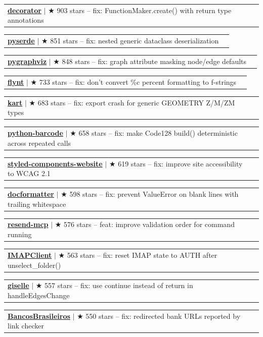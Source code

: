 \documentclass[letterpaper,11pt]{article}
\makeatletter
\newcommand{\resumeProjectHeading}[2]{
    \item
    \begin{tabular*}{0.97\textwidth}{l@{\extracolsep{\fill}}r}
      \small#1 & \hspace{8pt}\small#2 \\
    \end{tabular*}\vspace{-11.4pt}
}
\makeatother
\begin{document}
      \resumeProjectHeading{\textbf{\href{https://github.com/micheles/decorator/pull/186}{decorator}} $|$ {\small $\bigstar$ 903 stars} \textnormal{ -- fix: FunctionMaker.create() with return type annotations}}{}
      \resumeProjectHeading{\textbf{\href{https://github.com/yukinarit/pyserde/pull/775}{pyserde}} $|$ {\small $\bigstar$ 851 stars} \textnormal{ -- fix: nested generic dataclass deserialization}}{}
      \resumeProjectHeading{\textbf{\href{https://github.com/pygraphviz/pygraphviz/pull/639}{pygraphviz}} $|$ {\small $\bigstar$ 848 stars} \textnormal{ -- fix: graph attribute masking node/edge defaults}}{}
      \resumeProjectHeading{\textbf{\href{https://github.com/ikamensh/flynt/pull/254}{flynt}} $|$ {\small $\bigstar$ 733 stars} \textnormal{ -- fix: don't convert \%c percent formatting to f-strings}}{}
      \resumeProjectHeading{\textbf{\href{https://github.com/koordinates/kart/pull/1120}{kart}} $|$ {\small $\bigstar$ 683 stars} \textnormal{ -- fix: export crash for generic GEOMETRY Z/M/ZM types}}{}
      \resumeProjectHeading{\textbf{\href{https://github.com/WhyNotHugo/python-barcode/commit/73316bf7e485b8aefcf89f3aaab8f76b8f261375}{python-barcode}} $|$ {\small $\bigstar$ 658 stars} \textnormal{ -- fix: make Code128 build() deterministic across repeated calls}}{}
      \resumeProjectHeading{\textbf{\href{https://github.com/styled-components/styled-components-website/pull/993}{styled-components-website}} $|$ {\small $\bigstar$ 619 stars} \textnormal{ -- fix: improve site accessibility to WCAG 2.1}}{}
      \resumeProjectHeading{\textbf{\href{https://github.com/PyCQA/docformatter/pull/360}{docformatter}} $|$ {\small $\bigstar$ 598 stars} \textnormal{ -- fix: prevent ValueError on blank lines with trailing whitespace}}{}
      \resumeProjectHeading{\textbf{\href{https://github.com/resend/resend-mcp/pull/166}{resend-mcp}} $|$ {\small $\bigstar$ 576 stars} \textnormal{ -- feat: improve validation order for command running}}{}
      \resumeProjectHeading{\textbf{\href{https://github.com/mjs/imapclient/pull/644}{IMAPClient}} $|$ {\small $\bigstar$ 563 stars} \textnormal{ -- fix: reset IMAP state to AUTH after unselect\_folder()}}{}
      \resumeProjectHeading{\textbf{\href{https://github.com/giselles-ai/giselle/pull/2739}{giselle}} $|$ {\small $\bigstar$ 557 stars} \textnormal{ -- fix: use continue instead of return in handleEdgesChange}}{}
      \resumeProjectHeading{\textbf{\href{https://github.com/guibranco/BancosBrasileiros/pull/895}{BancosBrasileiros}} $|$ {\small $\bigstar$ 550 stars} \textnormal{ -- fix: redirected bank URLs reported by link checker}}{}
\end{document}
